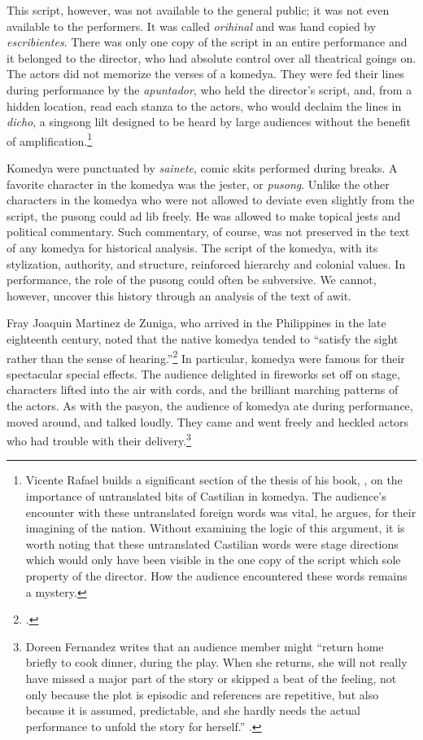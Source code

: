 This script, however, was not available to the general public; it was not even available to the performers. It was called \textit{orihinal} and was hand copied by \textit{escribientes}. There was only one copy of the script in an entire performance and it belonged to the director, who had absolute control over all theatrical goings on. The actors did not memorize the verses of a komedya. They were fed their lines during performance by the \textit{apuntador}, who held the director’s script, and, from a hidden location, read each stanza to the actors, who would declaim the lines in \textit{dicho}, a singsong lilt designed to be heard by large audiences without the benefit of amplification.\footnote{Vicente Rafael builds a significant section of the thesis of his book, \cite{Rafael2005}, on the importance of untranslated bits of Castilian in komedya. The audience’s encounter with these untranslated foreign words was vital, he argues, for their imagining of the nation. Without examining the logic of this argument, it is worth noting that these untranslated Castilian words were stage directions which would only have been visible in the one copy of the script which sole property of the director. How the audience encountered these words remains a mystery.} 

Komedya were punctuated by \textit{sainete}, comic skits performed during breaks. A favorite character in the komedya was the jester, or \textit{pusong}. Unlike the other characters in the komedya who were not allowed to deviate even slightly from the script, the pusong could ad lib freely. He was allowed to make topical jests and political commentary. Such commentary, of course, was not preserved in the text of any komedya for historical analysis. The script of the komedya, with its stylization, authority, and structure, reinforced hierarchy and colonial values. In performance, the role of the pusong could often be subversive. We cannot, however, uncover this history through an analysis of the text of awit.

Fray Joaquin Martinez de Zuniga, who arrived in the Philippines in the late eighteenth century, noted that the native komedya tended to \enquote{satisfy the sight rather than the sense of hearing.}\footcite[9]{Fernandez1996} In particular, komedya were famous for their spectacular special effects. The audience delighted in fireworks set off on stage, characters lifted into the air with cords, and the brilliant marching patterns of the actors. As with the pasyon, the audience of komedya ate during performance, moved around, and talked loudly. They came and went freely and heckled actors who had trouble with their delivery.\footnote{Doreen Fernandez writes that an audience member might \enquote{return home briefly to cook dinner, during the play. When she returns, she will not really have missed a major part of the story or skipped a beat of the feeling, not only because the plot is episodic and references are repetitive, but also because it is assumed, predictable, and she hardly needs the actual performance to unfold the story for herself.} \parencite[177]{Fernandez1996}.}

